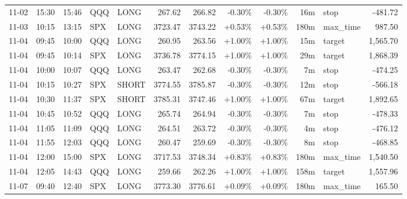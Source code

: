 \documentclass[11pt,a4paper,twoside]{article}
\begin{document}
\begin{center}
\begin{longtable}{>{\color{txtmain}}l l l l l r r r r r >{\color{txtmain}}l r}
11-02 & 15:30 & 15:46 & QQQ & LONG & 267.62 & 266.82 & \textcolor{lossred}{-0.30\%} & \textcolor{lossred}{-0.30\%} & 16m & stop & \textcolor{lossred}{-481.72} \\
11-03 & 10:15 & 13:15 & SPX & LONG & 3723.47 & 3743.22 & \textcolor{wingreen}{+0.53\%} & \textcolor{wingreen}{+0.53\%} & 180m & max\_time & \textcolor{wingreen}{987.50} \\
11-04 & 09:45 & 10:00 & QQQ & LONG & 260.95 & 263.56 & \textcolor{wingreen}{+1.00\%} & \textcolor{wingreen}{+1.00\%} & 15m & target & \textcolor{wingreen}{1,565.70} \\
11-04 & 09:45 & 10:14 & SPX & LONG & 3736.78 & 3774.15 & \textcolor{wingreen}{+1.00\%} & \textcolor{wingreen}{+1.00\%} & 29m & target & \textcolor{wingreen}{1,868.39} \\
11-04 & 10:00 & 10:07 & QQQ & LONG & 263.47 & 262.68 & \textcolor{lossred}{-0.30\%} & \textcolor{lossred}{-0.30\%} & 7m & stop & \textcolor{lossred}{-474.25} \\
11-04 & 10:15 & 10:27 & SPX & SHORT & 3774.55 & 3785.87 & \textcolor{lossred}{-0.30\%} & \textcolor{lossred}{-0.30\%} & 12m & stop & \textcolor{lossred}{-566.18} \\
11-04 & 10:30 & 11:37 & SPX & SHORT & 3785.31 & 3747.46 & \textcolor{wingreen}{+1.00\%} & \textcolor{wingreen}{+1.00\%} & 67m & target & \textcolor{wingreen}{1,892.65} \\
11-04 & 10:45 & 10:52 & QQQ & LONG & 265.74 & 264.94 & \textcolor{lossred}{-0.30\%} & \textcolor{lossred}{-0.30\%} & 7m & stop & \textcolor{lossred}{-478.33} \\
11-04 & 11:05 & 11:09 & QQQ & LONG & 264.51 & 263.72 & \textcolor{lossred}{-0.30\%} & \textcolor{lossred}{-0.30\%} & 4m & stop & \textcolor{lossred}{-476.12} \\
11-04 & 11:55 & 12:03 & QQQ & LONG & 260.47 & 259.69 & \textcolor{lossred}{-0.30\%} & \textcolor{lossred}{-0.30\%} & 8m & stop & \textcolor{lossred}{-468.85} \\
11-04 & 12:00 & 15:00 & SPX & LONG & 3717.53 & 3748.34 & \textcolor{wingreen}{+0.83\%} & \textcolor{wingreen}{+0.83\%} & 180m & max\_time & \textcolor{wingreen}{1,540.50} \\
11-04 & 12:05 & 14:43 & QQQ & LONG & 259.66 & 262.26 & \textcolor{wingreen}{+1.00\%} & \textcolor{wingreen}{+1.00\%} & 158m & target & \textcolor{wingreen}{1,557.96} \\
11-07 & 09:40 & 12:40 & SPX & LONG & 3773.30 & 3776.61 & \textcolor{wingreen}{+0.09\%} & \textcolor{wingreen}{+0.09\%} & 180m & max\_time & \textcolor{wingreen}{165.50} \\

\end{longtable}
\end{center}
\end{document}
